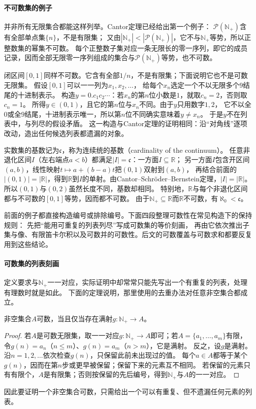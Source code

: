 \paragraph{不可数集的例子}
\label{sec:comb-uncountable-power-set}

并非所有无限集合都能这样列举。Cantor定理已经给出第一个例子：
$\mathcal P(\mathbb N_+)$含有全部单点集$\{n\}$，不是有限集；
又由$|\mathbb N_+|<|\mathcal P(\mathbb N_+)|$，它不与$\mathbb N_+$等势，所以正整数集的幂集不可数。
每个正整数子集对应一条无限长的零一序列，即它的成员记录，因而全部无限零一序列组成的集合与$\mathcal P(\mathbb N_+)$等势，也不可数。

闭区间$[0,1]$同样不可数。它含有全部$1/n$，不是有限集；下面说明它也不是可数无限集。
假设$[0,1]$可以一一列为$x_1,x_2,\ldots$，
给每个$x_n$选定一个不以无限多个$9$结尾的十进制表示。
构造$y=0.c_1c_2\cdots$：若$x_n$的第$n$位小数是$1$，就取$c_n=2$，否则取$c_n=1$。
所得$y\in(0,1)$，且它的第$n$位与$x_n$不同。由于$y$只用数字$1,2$，
它不以全$0$或全$9$结尾，十进制表示唯一，所以第$n$位不同确实意味着$y\neq x_n$。
于是$y$不在列表中，与列尽的假设矛盾。
这一构造与Cantor定理的证明相同：沿“对角线”逐项改动，造出任何候选列表都遗漏的对象。

实数集的基数记为$\mathfrak c$，称为连续统的基数（cardinality of the continuum）。
任意非退化区间$I$（左右端点$a<b$）都满足$|I|=\mathfrak c$：一方面$I\subseteq\mathbb R$；
另一方面$I$包含开区间$(a,b)$，线性映射$t\mapsto a+(b-a)t$把$(0,1)$双射到$(a,b)$，
再结合前面的$|(0,1)|=|\mathbb R|$，得到$\mathbb R$到$I$的单射。由Cantor--Schröder--Bernstein定理，$|I|=|\mathbb R|$。
所以$(0,1)$与$(0,2)$虽然长度不同，基数却相同。
特别地，$\mathbb R$与每个非退化区间都与不可数的$[0,1]$等势，因而都不可数。
由于$\mathbb N_+\subseteq\mathbb R$而$\mathbb R$不可数，有$\aleph_0<\mathfrak c$。

前面的例子都直接构造编号或排除编号。下面四段整理可数性在常见构造下的保持规则：
先把“能用可重复的列表列尽”写成可数集的等价刻画，
再由它依次推出子集与像、有限笛卡尔积以及可数并的可数性。后文的可数覆盖与可数求和都要反复用到这些结论。

\paragraph{可数集的列表刻画}
定义要求与$\mathbb N_+$一一对应，实际证明中却常常只能先写出一个有重复的列表，处理有理数时就是如此。
下面的定理说明，那里使用的去重办法对任意非空集合都成立。
\begin{theorem}[可数集的列表刻画]
\label{thm:comb-countable-surjection}
非空集合$A$可数，当且仅当存在满射$g:\mathbb N_+\to A$。
\end{theorem}
\begin{proof}
若$A$是可数无限集，取一一对应$g:\mathbb N_+\to A$即可；若$A=\{a_1,\ldots,a_m\}$有限，
令$g(n)=a_n$（$n\leq m$）、$g(n)=a_m$（$n>m$），它是满射。
反之，设$g$是满射。沿$n=1,2,\ldots$依次检查$g(n)$，只保留此前未出现过的值。
每个$a\in A$都等于某个$g(n)$，因而在第$n$步或更早被保留；保留下来的元素互不相同。
若保留的元素只有有限个，$A$是有限集；否则按保留的先后编号，得到$\mathbb N_+$与$A$的一一对应。
\end{proof}
因此要证明一个非空集合可数，只需给出一个可以有重复、但不遗漏任何元素的列表。

